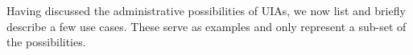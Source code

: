 Having discussed the administrative possibilities of UIAs, we now list and
briefly describe a few use cases. These serve as examples and only represent a
sub-set of the possibilities.
